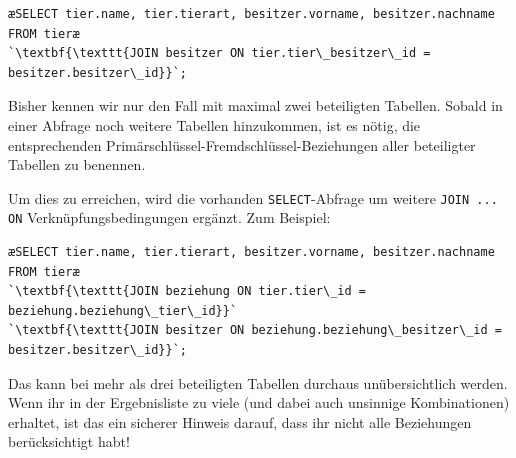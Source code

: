 \begin{lstlisting}
æSELECT tier.name, tier.tierart, besitzer.vorname, besitzer.nachname
FROM tieræ 
`\textbf{\texttt{JOIN besitzer ON tier.tier\_besitzer\_id = besitzer.besitzer\_id}}`;
\end{lstlisting}

Bisher kennen wir nur den Fall mit maximal zwei beteiligten Tabellen. Sobald in
einer Abfrage noch weitere Tabellen hinzukommen, ist es nötig, die
entsprechenden Primärschlüssel-Fremdschlüssel-Beziehungen aller beteiligter
Tabellen zu benennen. 

Um dies zu erreichen, wird die vorhanden \lstinline|SELECT|-Abfrage um weitere
\lstinline|JOIN ... ON| Verknüpfungsbedingungen ergänzt. Zum Beispiel:

\begin{lstlisting}
æSELECT tier.name, tier.tierart, besitzer.vorname, besitzer.nachname
FROM tieræ
`\textbf{\texttt{JOIN beziehung ON tier.tier\_id = beziehung.beziehung\_tier\_id}}`
`\textbf{\texttt{JOIN besitzer ON beziehung.beziehung\_besitzer\_id = besitzer.besitzer\_id}}`;
\end{lstlisting}


Das kann bei mehr als drei beteiligten Tabellen durchaus 
unübersichtlich werden. Wenn ihr in der Ergebnisliste zu viele (und dabei auch 
unsinnige Kombinationen) erhaltet, ist das ein sicherer Hinweis darauf, dass 
ihr nicht alle Beziehungen berücksichtigt habt!
